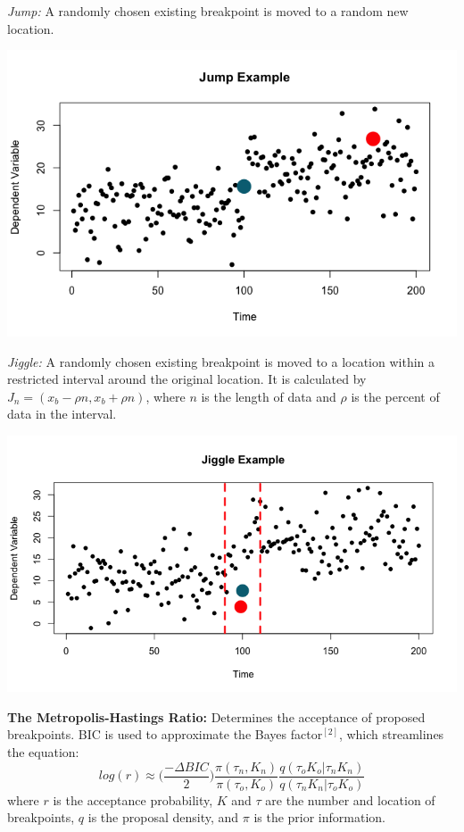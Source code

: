 \documentclass[landscape,a0paper,fontscale=0.285]{baposter} %
\begin{document}
\begin{poster}
{\begin{multicols}{2}
\textit{Jump:} A randomly chosen existing breakpoint is moved to a random new location. \\

\begin{center}
\includegraphics[width=.55\linewidth]{jump_example}
\end{center}

\textit{Jiggle:} A randomly chosen existing breakpoint is moved to a location within a restricted interval around the original location. It is calculated by $J_n = (x_b-\rho n, x_b+\rho n)$, where $n$ is the length of data and $\rho$ is the percent of data in the interval. 
\begin{center}
\includegraphics[width=.55\linewidth]{jiggle_example}
\end{center}





\textbf{The Metropolis-Hastings Ratio:} Determines the acceptance of proposed breakpoints. BIC is used to approximate the Bayes factor$^{[2]}$, which streamlines the equation: 
\begin{equation}
log(r) \approx \Big( \frac{- \Delta BIC}{2}\Big) \frac{\pi (\tau_n,K_n)}{\pi(\tau_o,K_o)} \frac{q(\tau_o K_o | \tau_nK_n)}{q(\tau_n K_n | \tau_oK_o)}
\end{equation}
where $r$ is the acceptance probability, $K$ and $\tau$ are the number and location of breakpoints, $q$ is the proposal density, and $\pi$ is the prior information. 


\end{multicols}}
\end{poster}
\end{document}

